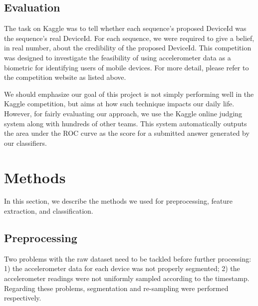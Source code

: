 \documentclass{article} %
\begin{document}
\subsection{Evaluation}
The task on Kaggle was to tell whether each sequence's proposed DeviceId was the sequence's real DeviceId. For each sequence, we were required to give a belief, in real number, about the credibility of the proposed DeviceId. This competition was designed to investigate the feasibility of using accelerometer data as a biometric for identifying users of mobile devices. For more detail, please refer to the competition website as listed above.

We should emphasize our goal of this project is not simply performing well in the Kaggle competition, but aims at how such technique impacts our daily life. However, for fairly evaluating our approach, we use the Kaggle online judging system along with hundreds of other teams. This system automatically outputs the area under the ROC curve as the score for a submitted answer generated by our classifiers. 


\section{Methods}
In this section, we describe the methods we used for preprocessing, feature extraction, and classification.


\subsection{Preprocessing}
Two problems with the raw dataset need to be tackled before further processing: 1) the accelerometer data for each device was not properly segmented; 2) the accelerometer readings were not uniformly sampled according to the timestamp. Regarding these problems, segmentation and re-sampling were performed respectively.
\end{document}
